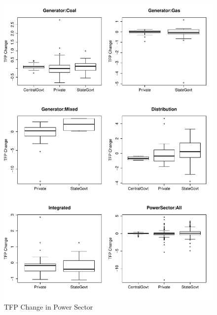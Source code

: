 \begin{figure}[h]
\centering
\caption{TFP Change in Power Sector}
	\label{fig:TFPChange}
	\includegraphics[width=1.00\textwidth]{chapter02/TFPChange.pdf}	
\end{figure}

